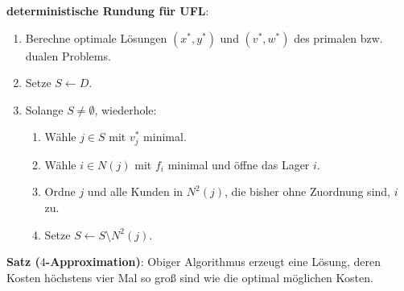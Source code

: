 \textbf{deterministische Rundung für UFL}:
\begin{enumerate}
    \item
    Berechne optimale Lösungen $(x^\ast, y^\ast)$ und
    $(v^\ast, w^\ast)$ des primalen bzw. dualen Problems.
    
    \item
    Setze $S \leftarrow D$.
    
    \item
    Solange $S \not= \emptyset$, wiederhole:
    \begin{enumerate}
        \item
        Wähle $j \in S$ mit $v_j^\ast$ minimal.
        
        \item
        Wähle $i \in N(j)$ mit $f_i$ minimal und öffne das Lager $i$.
        
        \item
        Ordne $j$ und alle Kunden in $N^2(j)$, die bisher ohne Zuordnung sind, $i$ zu.
        
        \item
        Setze $S \leftarrow S \setminus N^2(j)$.
    \end{enumerate}
\end{enumerate}

\linie

\textbf{Satz ($4$-Approximation)}:
Obiger Algorithmus erzeugt eine Lösung, deren Kosten höchstens
vier Mal so groß sind wie die optimal möglichen Kosten.

